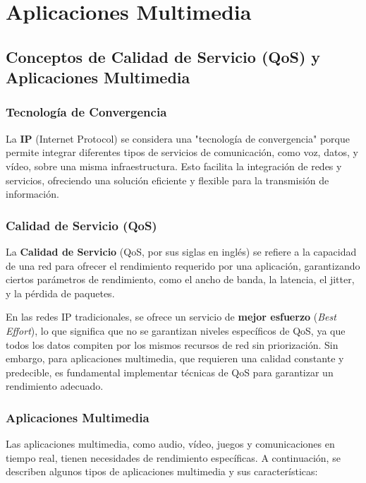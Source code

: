 \documentclass[a4paper,12pt]{article}
\begin{document}
\section{Aplicaciones Multimedia}

\subsection{Conceptos de Calidad de Servicio (QoS) y Aplicaciones Multimedia}

\subsubsection{Tecnología de Convergencia}

La \textbf{IP} (Internet Protocol) se considera una "tecnología de convergencia" porque permite integrar diferentes tipos de servicios de comunicación, como voz, datos, y vídeo, sobre una misma infraestructura. Esto facilita la integración de redes y servicios, ofreciendo una solución eficiente y flexible para la transmisión de información.

\subsubsection{Calidad de Servicio (QoS)}

La \textbf{Calidad de Servicio} (QoS, por sus siglas en inglés) se refiere a la capacidad de una red para ofrecer el rendimiento requerido por una aplicación, garantizando ciertos parámetros de rendimiento, como el ancho de banda, la latencia, el jitter, y la pérdida de paquetes. 

En las redes IP tradicionales, se ofrece un servicio de \textbf{mejor esfuerzo} (\textit{Best Effort}), lo que significa que no se garantizan niveles específicos de QoS, ya que todos los datos compiten por los mismos recursos de red sin priorización. Sin embargo, para aplicaciones multimedia, que requieren una calidad constante y predecible, es fundamental implementar técnicas de QoS para garantizar un rendimiento adecuado.

\subsubsection{Aplicaciones Multimedia}

Las aplicaciones multimedia, como audio, vídeo, juegos y comunicaciones en tiempo real, tienen necesidades de rendimiento específicas. A continuación, se describen algunos tipos de aplicaciones multimedia y sus características:
\end{document}
